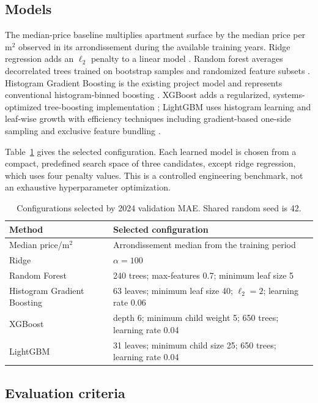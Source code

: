 \documentclass[11pt,a4paper]{article}
\begin{document}
\subsection{Models}

The median-price baseline multiplies apartment surface by the median price per
m$^2$ observed in its arrondissement during the available training years. Ridge
regression adds an $\ell_2$ penalty to a linear model \cite{hoerl1970}. Random
forest averages decorrelated trees trained on bootstrap samples and randomized
feature subsets \cite{breiman2001}. Histogram Gradient Boosting is the existing
project model and represents conventional histogram-binned boosting
\cite{friedman2001}. XGBoost adds a regularized, systems-optimized tree-boosting
implementation \cite{chen2016}; LightGBM uses histogram learning and leaf-wise
growth with efficiency techniques including gradient-based one-side sampling and
exclusive feature bundling \cite{ke2017}.

Table~\ref{tab:config} gives the selected configuration. Each learned model is
chosen from a compact, predefined search space of three candidates, except ridge
regression, which uses four penalty values. This is a controlled engineering
benchmark, not an exhaustive hyperparameter optimization.

\begin{table}[htbp]
\centering
\caption{Configurations selected by 2024 validation MAE. Shared random seed is 42.}
\label{tab:config}
\small
\begin{tabular}{p{3.4cm}p{10.2cm}}
\toprule
Method & Selected configuration \\
\midrule
Median price/m$^2$ & Arrondissement median from the training period \\
Ridge & $\alpha=100$ \\
Random Forest & 240 trees; max-features 0.7; minimum leaf size 5 \\
Histogram Gradient Boosting & 63 leaves; minimum leaf size 40; $\ell_2=2$; learning rate 0.06 \\
XGBoost & depth 6; minimum child weight 5; 650 trees; learning rate 0.04 \\
LightGBM & 31 leaves; minimum child size 25; 650 trees; learning rate 0.04 \\
\bottomrule
\end{tabular}
\end{table}

\subsection{Evaluation criteria}
\end{document}
